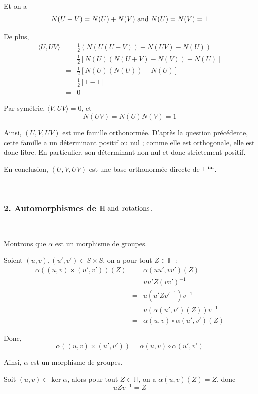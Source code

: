 Et on a
\[ N (U + V) = N (U) + N (V) \text{ and } N (U) = N (V) = 1 \]


De plus,
\begin{eqnarray*}
  \langle U, U V \rangle & = & \frac{1}{2} (N (U (U + V)) - N (U V) - N (U))\\
  & = & \frac{1}{2} [N (U) (N (U + V) - N (V)) - N (U)]\\
  & = & \frac{1}{2} [N (U) (N (U)) - N (U)]\\
  & = & \frac{1}{2} [1 - 1]\\
  & = & 0
\end{eqnarray*}


Par sym{\'e}trie, $\langle V, U V \rangle = 0$, et
\[ N (U V) = N (U) N (V) = 1 \]


Ainsi, $(U, V, U V)$ est une famille orthonorm{\'e}e. D'apr{\`e}s la question
pr{\'e}c{\'e}dente, cette famille a un d{\'e}terminant positif ou nul ; comme
elle est orthogonale, elle est donc libre. En particulier, son d{\'e}terminant
non nul et donc strictement positif.

En conclusion, $(U, V, U V)$ est une base orthonorm{\'e}e directe de
$\mathbb{H}^{\operatorname{im}}$.

\

\subsubsection*{2. Automorphismes de $\mathbb{H} \text{ and } \operatorname{rotations}
.$}

\

 Montrons que $\alpha$ est un morphisme de groupes.

Soient $(u, v), (u', v') \in S \times S$, on a pour tout $Z \in \mathbb{H}$ :
\begin{eqnarray*}
  \alpha ((u, v) \times (u', v')) (Z) & = & \alpha (u u', v v') (Z)\\
  & = & u u' Z (v v')^{- 1}\\
  & = & u \left( u' {Z v'}^{- 1} \right) v^{- 1}\\
  & = & u (\alpha (u', v') (Z)) v^{- 1}\\
  & = & \alpha (u, v) \circ \alpha (u', v') (Z)
\end{eqnarray*}


Donc,
\[ \alpha ((u, v) \times (u', v')) = \alpha (u, v) \circ \alpha (u', v') \]


Ainsi, $\alpha$ est un morphisme de groupes.

Soit $(u, v) \in \ker \alpha$, alors pour tout $Z \in \mathbb{H}$, on a
$\alpha (u, v) (Z) = Z$, donc
\[ u Z v^{- 1} = Z \]


